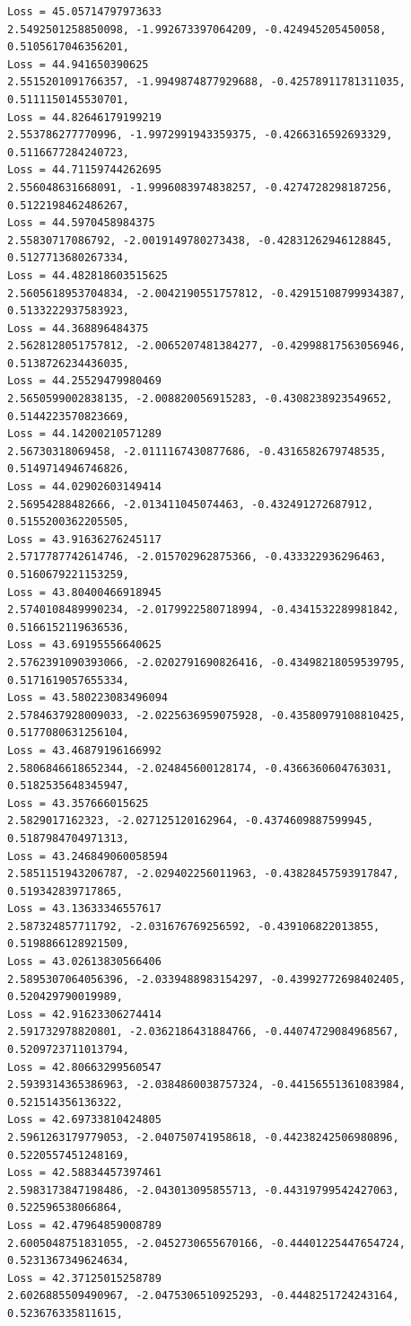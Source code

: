 \documentclass[11pt]{article}
\begin{document}
\begin{Verbatim}[commandchars=\\\{\}]
Loss = 45.05714797973633
2.5492501258850098, -1.992673397064209, -0.424945205450058, 0.5105617046356201,
Loss = 44.941650390625
2.5515201091766357, -1.9949874877929688, -0.42578911781311035,
0.5111150145530701,
Loss = 44.82646179199219
2.553786277770996, -1.9972991943359375, -0.4266316592693329, 0.5116677284240723,
Loss = 44.71159744262695
2.556048631668091, -1.9996083974838257, -0.4274728298187256, 0.5122198462486267,
Loss = 44.5970458984375
2.55830717086792, -2.0019149780273438, -0.42831262946128845, 0.5127713680267334,
Loss = 44.482818603515625
2.5605618953704834, -2.0042190551757812, -0.42915108799934387,
0.5133222937583923,
Loss = 44.368896484375
2.5628128051757812, -2.0065207481384277, -0.42998817563056946,
0.5138726234436035,
Loss = 44.25529479980469
2.5650599002838135, -2.008820056915283, -0.4308238923549652, 0.5144223570823669,
Loss = 44.14200210571289
2.56730318069458, -2.0111167430877686, -0.4316582679748535, 0.5149714946746826,
Loss = 44.02902603149414
2.56954288482666, -2.013411045074463, -0.432491272687912, 0.5155200362205505,
Loss = 43.91636276245117
2.5717787742614746, -2.015702962875366, -0.433322936296463, 0.5160679221153259,
Loss = 43.80400466918945
2.5740108489990234, -2.0179922580718994, -0.4341532289981842,
0.5166152119636536,
Loss = 43.69195556640625
2.5762391090393066, -2.0202791690826416, -0.43498218059539795,
0.5171619057655334,
Loss = 43.580223083496094
2.5784637928009033, -2.0225636959075928, -0.43580979108810425,
0.5177080631256104,
Loss = 43.46879196166992
2.5806846618652344, -2.024845600128174, -0.4366360604763031, 0.5182535648345947,
Loss = 43.357666015625
2.5829017162323, -2.027125120162964, -0.4374609887599945, 0.5187984704971313,
Loss = 43.246849060058594
2.5851151943206787, -2.029402256011963, -0.43828457593917847, 0.519342839717865,
Loss = 43.13633346557617
2.587324857711792, -2.031676769256592, -0.439106822013855, 0.5198866128921509,
Loss = 43.02613830566406
2.5895307064056396, -2.0339488983154297, -0.43992772698402405,
0.520429790019989,
Loss = 42.91623306274414
2.591732978820801, -2.0362186431884766, -0.44074729084968567,
0.5209723711013794,
Loss = 42.80663299560547
2.5939314365386963, -2.0384860038757324, -0.44156551361083984,
0.521514356136322,
Loss = 42.69733810424805
2.5961263179779053, -2.040750741958618, -0.44238242506980896,
0.5220557451248169,
Loss = 42.58834457397461
2.5983173847198486, -2.043013095855713, -0.44319799542427063, 0.522596538066864,
Loss = 42.47964859008789
2.6005048751831055, -2.0452730655670166, -0.44401225447654724,
0.5231367349624634,
Loss = 42.37125015258789
2.6026885509490967, -2.0475306510925293, -0.4448251724243164, 0.523676335811615,

\end{Verbatim}
\end{document}
